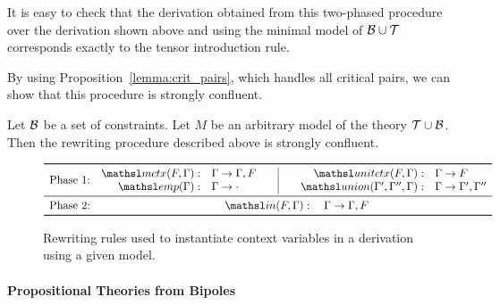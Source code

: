 It is easy to check that the derivation obtained from this two-phased
procedure over the derivation shown above and using the minimal model
of ${\cal B} \cup {\cal T}$ corresponds exactly to the tensor introduction
rule. 

By using Proposition~\ref{lemma:crit_pairs}, which handles all critical
pairs, we can show that this procedure is strongly confluent.

\begin{proposition}
\label{lemma:convergence}
Let $\mathcal{B}$ be a set of constraints. Let $M$ be an arbitrary model of
the theory ${\cal T} \cup
\mathcal{B}$. Then the rewriting procedure described above is
strongly confluent.
\end{proposition}


\begin{figure}[t]
\[
 \begin{array}{l@{\quad}r@{\quad}l@{\qquad}|@{\qquad}r@{\quad}l}
\toprule
\multirow{2}{*}{\textrm{Phase 1:}} & \mctx{F}{\Gamma}: & \Gamma \rightarrow
\Gamma, F 
& \elin{F}{\Gamma}:  & \Gamma \rightarrow F \\
& \emp{\Gamma}: & \Gamma \rightarrow \cdot 
& \union{\Gamma'}{\Gamma''}{\Gamma}: & \Gamma \rightarrow \Gamma',
\Gamma''\\
\midrule
\textrm{Phase 2:} & \multicolumn{4}{c}{
\In{F}{\Gamma}: \quad \Gamma \rightarrow \Gamma, F
}\\
\bottomrule
 \end{array}
\]
\caption{Rewriting rules used to instantiate context variables in a
derivation using a given model.}
\label{fig:rewriting}
\vspace{-5mm}
\end{figure}

\newcommand\bipole{\tsl{bipole}}
\newcommand\bipoleAux{\tsl{bipoleNegative}}

\paragraph{Propositional Theories from Bipoles}


\renewcommand{\algorithmicrequire}{\textbf{Input:}}
\renewcommand{\algorithmicensure}{\textbf{Output:}}


